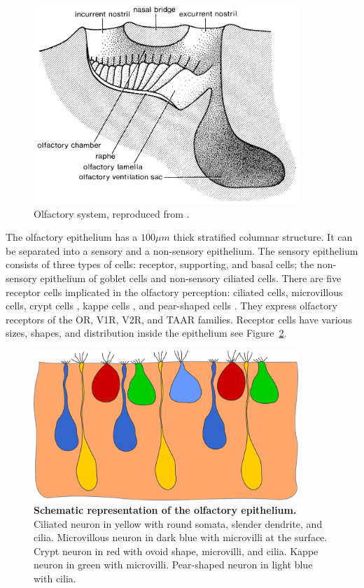     \begin{figure}[h]
      \centering
      \includegraphics[width=10cm]{part_2/assets/olfactory_schematic.png}
      \caption{Olfactory system, reproduced from \cite{hara2012fish}.}
      \label{olfactory_schematic}
    \end{figure}


    The olfactory epithelium has a $100\mu m$ thick stratified columnar structure. It can be separated into a sensory and a non-sensory epithelium. The sensory epithelium consists of three types of cells: receptor, supporting, and basal cells; the non-sensory epithelium of goblet cells and non-sensory ciliated cells. There are five receptor cells implicated in the olfactory perception: ciliated cells, microvillous cells, crypt cells \cite{ichikawa1977fine,hansen2005diversity}, kappe cells \cite{ahuja2014kappe}, and pear-shaped cells \cite{wakisaka2017adenosine}. They express olfactory receptors of the OR, V1R, V2R, and TAAR families. Receptor cells have various sizes, shapes, and distribution inside the epithelium see Figure~\ref{olfactory_schematic_full}.

    \begin{figure}[h]
      \centering
      \includegraphics[width=10cm]{part_2/assets/olfactory_schematic_full.png}
      \caption{{\bf Schematic representation of the olfactory epithelium.} Ciliated neuron in yellow with round somata, slender dendrite, and cilia. Microvillous neuron in dark blue with microvilli at the surface. Crypt neuron in red with ovoid shape, microvilli, and cilia. Kappe neuron in green with microvilli. Pear-shaped neuron in light blue with cilia.}
      \label{olfactory_schematic_full}
    \end{figure}

